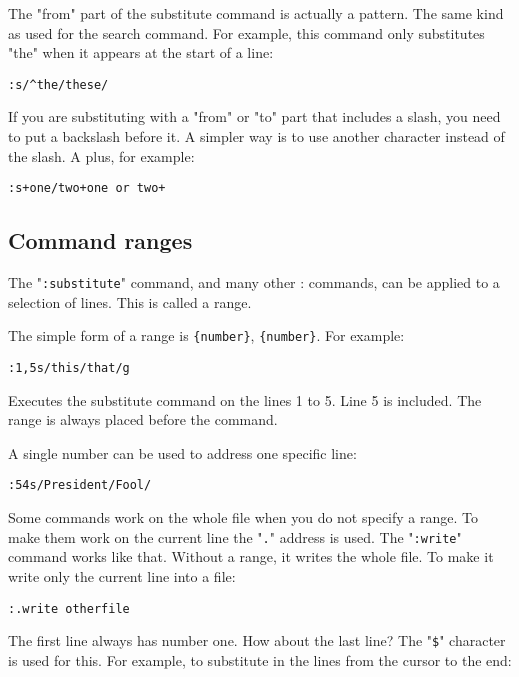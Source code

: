 The "from" part of the substitute command is actually a pattern.
The same kind as used for the search command.
For example, this command only substitutes "the" when it appears at the start of a line:

\begin{Verbatim}[samepage=true]
 :s/^the/these/
\end{Verbatim}

If you are substituting with a "from" or "to" part that includes a slash, you need to put a backslash before it.
A simpler way is to use another character instead of the slash.
A plus, for example:

\begin{Verbatim}[samepage=true]
 :s+one/two+one or two+
\end{Verbatim}
\subsection{Command ranges}
\label{Command ranges}
The "\texttt{:substitute}" command, and many other : commands, can be applied to a selection of lines.
This is called a range.

The simple form of a range is \texttt{\{number\}}, \texttt{\{number\}}.
For example:

\begin{Verbatim}[samepage=true]
 :1,5s/this/that/g
\end{Verbatim}

Executes the substitute command on the lines 1 to 5.
Line 5 is included.
The range is always placed before the command.

A single number can be used to address one specific line:

\begin{Verbatim}[samepage=true]
 :54s/President/Fool/
\end{Verbatim}

Some commands work on the whole file when you do not specify a range.
To make them work on the current line the "\texttt{.}" address is used.
The "\texttt{:write}" command works like that.
Without a range, it writes the whole file.
To make it write only the current line into a file:

\begin{Verbatim}[samepage=true]
 :.write otherfile
\end{Verbatim}

The first line always has number one.
How about the last line?
The "\texttt{\$}" character is used for this.
For example, to substitute in the lines from the cursor to the end:

